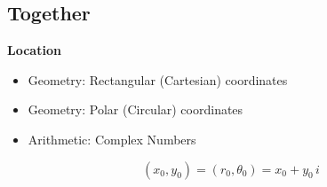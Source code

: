 \documentclass{ximera}
\begin{document}
\qquad




\subsection*{Together}



\textbf{\textcolor{purple!85!blue}{Location}} \\


\begin{itemize}
\item Geometry: Rectangular (Cartesian) coordinates
\item Geometry: Polar (Circular) coordinates
\item Arithmetic: Complex Numbers
\end{itemize}



\[
(x_0, y_0) = (r_0, \theta_0) = x_0 + y_0 \, i
\]
\end{document}
